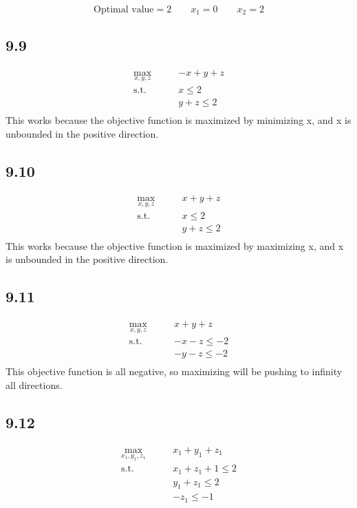 \documentclass[letterpaper,12pt]{article}
\theoremstyle{definition}
\begin{document}
\[ \text{Optimal value} = 2 \qquad x_1 = 0 \qquad x_2 = 2\]


\subsection*{9.9}


\begin{align*}
\displaystyle \max_{x, y, z} \qquad &-x +y +z\\ 
 \text{s.t.} \qquad  &x\leq 2\\
&y+z \leq 2\\
\end{align*}
This works because the objective function is maximized by minimizing x, and
x is unbounded in the positive direction.\\

\subsection*{9.10}


\begin{align*}
\displaystyle \max_{x, y, z} \qquad &x +y +z\\ 
\text{s.t.} \qquad &x\leq 2\\
&y+z \leq 2\\
\end{align*}
This works because the objective function is maximized by maximizing x, and
x is unbounded in the positive direction.\\

\subsection*{9.11}


\begin{align*}
\displaystyle \max_{x, y, z} \qquad &x +y +z\\ 
\text{s.t.} \qquad &-x-z \leq -2\\
&-y-z \leq -2\\
\end{align*}
This objective function is all negative, so maximizing will be pushing to
infinity all directions.\\

\subsection*{9.12}


\begin{align*}
\displaystyle \max_{x_1, y_1, z_1} \qquad &x_1  +y_1 +z_1\\ 
\text{s.t.} \qquad &x_1+z_1+1 \leq 2\\
&y_1+z_1 \leq 2\\
&-z_1 \leq -1
\end{align*}
\end{document}
